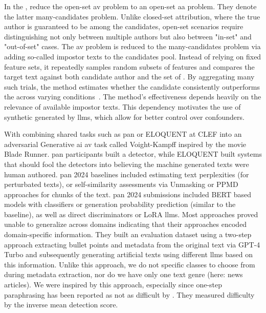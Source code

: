 
In the \impAppr{}, \citet{koppel_determining_2014} reduce the open-set \ac{av} problem to an open-set \ac{aa} problem.
They denote the latter many-candidates problem. 
Unlike closed-set attribution, where the true author is guaranteed to be among the candidates, open-set scenarios require distinguishing not only between multiple authors but also between "in-set" and "out-of-set" cases. 
The \ac{av} problem is reduced to the many-candidates problem via adding so-called impostor texts to the candidates pool. 
Instead of relying on fixed feature sets, it repeatedly samples random subsets of features and compares the target text against both candidate author and the set of \imps{}. 
By aggregating many such trials, the method estimates whether the candidate consistently outperforms the \imps{} across varying conditions~\citep{koppel_determining_2014}. 
The method's effectiveness depends heavily on the relevance of available impostor texts. 
This dependency motivates the use of synthetic \imps{} generated by \acp{llm}, which allow for better control over confounders.

With combining shared tasks such as \acs{pan} or ELOQUENT at CLEF into an adversarial Generative \ac{ai} \ac{av} task called Voight-Kampff inspired by the movie Blade Runner.
\acs{pan} participants built a detector, while ELOQUENT built systems that should fool the detectors into believing the machine generated texts were human authored.
\acs{pan} 2024 baselines included estimating text perplexities (for perturbated texts), or self-similarity assessments via Unmasking or PPMD approaches for chunks of the text.
\acs{pan} 2024 submissions included BERT based models with classifiers or generation probability prediction (similar to the baseline), as well as direct discriminators or LoRA \acp{llm}.
Most approaches proved unable to generalize across domains indicating that their approaches encoded domain-specific information.
They built an evaluation dataset using a two-step approach extracting bullet points and metadata from the original text via GPT-4 Turbo and subsequently generating artificial texts using different \acp{llm} based on this information.
Unlike this approach, we do not specific classes to choose from during metadata extraction, nor do we have only one text genre (here: news articles).
We were inspired by this approach, especially since one-step paraphrasing has been reported as not as difficult by \citet{bevendorff_overview_2024}.
They measured difficulty by the inverse mean detection score.


